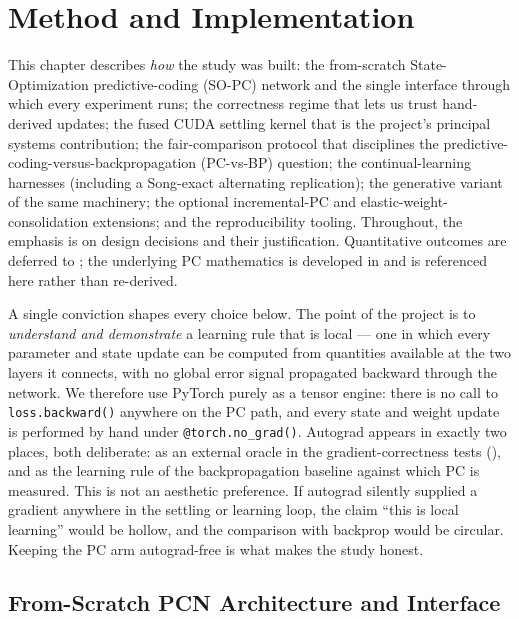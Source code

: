 \chapter{Method and Implementation}\label{ch:method}

This chapter describes \emph{how} the study was built: the from-scratch State-Optimization
predictive-coding (SO-PC) network and the single interface through which every experiment runs;
the correctness regime that lets us trust hand-derived updates; the fused CUDA settling kernel
that is the project's principal systems contribution; the fair-comparison protocol that
disciplines the predictive-coding-versus-backpropagation (PC-vs-BP) question; the
continual-learning harnesses (including a Song-exact alternating replication); the generative
variant of the same machinery; the optional incremental-PC and elastic-weight-consolidation
extensions; and the reproducibility tooling. Throughout, the emphasis is on design decisions and
their justification. Quantitative outcomes are deferred to ; the underlying
PC mathematics is developed in  and is referenced here rather than re-derived.

A single conviction shapes every choice below. The point of the project is to \emph{understand and
demonstrate} a learning rule that is local --- one in which every parameter and state update can be
computed from quantities available at the two layers it connects, with no global error signal
propagated backward through the network. We therefore use PyTorch \citep{paszke2019pytorch} purely
as a tensor engine: there is no call to \texttt{loss.backward()} anywhere on the PC path, and every
state and weight update is performed by hand under \texttt{@torch.no\_grad()}. Autograd appears in
exactly two places, both deliberate: as an external oracle in the gradient-correctness tests
(), and as the learning rule of the backpropagation baseline against
which PC is measured. This is not an aesthetic preference. If autograd silently supplied a gradient
anywhere in the settling or learning loop, the claim ``this is local learning'' would be hollow, and
the comparison with backprop would be circular. Keeping the PC arm autograd-free is what makes the
study honest.

\section{From-Scratch PCN Architecture and Interface}

